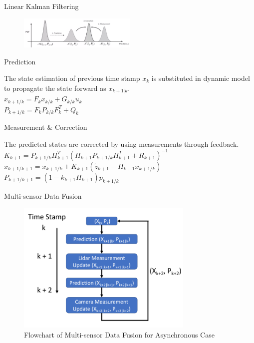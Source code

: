 \documentclass[10pt]{beamer}
\begin{document}
\begin{frame}{Linear Kalman Filtering}

\begin{figure}
    \centering
    \includegraphics[width=0.5\textwidth]{Images/KF.png}
\end{figure}
 \vspace{-5pt}
   \begin{block}{Prediction}
   
      The state estimation of previous time stamp $x_{k}$ is substituted in dynamic model to propagate the state forward as $x_{k+1|k}$. \\
      \centering
       $x_{k+1 / k}=F_{k} x_{k / k}+G_{k / k} u_{k}$\\ 
       $P_{k+1 / k}=F_{k} P_{k / k} F_{k}^{T}+Q_{k}$
   \end{block}
   \vspace{-5pt}
    \begin{block}{Measurement \& Correction}
    
      The predicted states are corrected by using measurements through feedback. 
      \centering
       $K_{k+1}=P_{k+1 / k} H_{k+1}^{T}\left(H_{k+1} P_{k+1 / k} H_{k+1}^{T}+R_{k+1}\right)^{-1}$\\
      $x_{k+1 / k+1}=x_{k+1 / k}+K_{k+1}\left(\tilde{z}_{k+1}-H_{k+1} x_{k+1 / k}\right)$\\
      $P_{k+1 / k+1}=\left(1-k_{k+1} H_{k+1}\right) p_{k+1 / k}$
   \end{block}  
\end{frame}

\begin{frame}{Multi-sensor Data Fusion}
\begin{figure}
    \centering
    \includegraphics[width=0.75\textwidth]{Images/fusion.png}
    \caption{Flowchart of Multi-sensor Data Fusion for Asynchronous Case}
\end{figure}
\end{frame}
\end{document}
